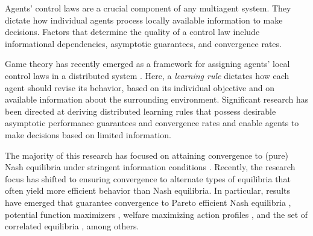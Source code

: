 \label{ch3}

Agents' control laws are a crucial component of any multiagent system. They dictate how individual agents process locally available information to make decisions. Factors that determine the quality of a control law include informational dependencies, asymptotic guarantees, and convergence rates. %

Game theory has recently emerged as a framework for assigning agents' local control laws in a distributed system \cite{Lasaulce2011,Alpcan2010,Han2012,MacKenzie2006,Menache2011}. Here, a \emph{learning rule} dictates how each agent should revise its behavior, based on its individual objective and on available information about the surrounding environment. Significant research has been directed at deriving distributed learning rules that possess desirable asymptotic performance guarantees and convergence rates and enable agents to make decisions based on limited information.

The majority of this research has focused on attaining convergence to (pure) Nash equilibria under stringent information conditions \cite{Young2009, Frihauf2012, Foster2006, Boussaton2012, Poveda2013, Gharesifard2012}. Recently, the research focus has shifted to ensuring convergence to alternate types of equilibria that often yield more efficient behavior than Nash equilibria.  In particular, results have emerged that guarantee convergence to Pareto efficient Nash equilibria \cite{Marden2009,Pradelski2012}, potential function maximizers \cite{Blume1993, Marden2012}, welfare maximizing action profiles \cite{Marden2011, Arieli2012}, and the set of correlated equilibria \cite{Hart2000,Marden2013c,Aumann1987,Foster1997}, among others.  


